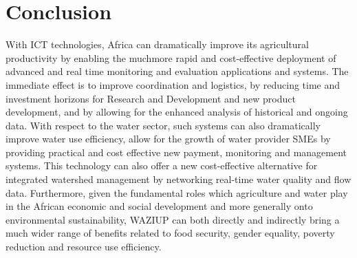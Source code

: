 
\section{Conclusion}
With ICT technologies, Africa can dramatically improve its agricultural productivity by enabling the muchmore rapid and cost-effective deployment of advanced and real time monitoring and evaluation applications and systems. 
The immediate effect is to improve coordination and logistics, by reducing time and investment horizons for Research and Development and new product development, and by allowing for the enhanced analysis of historical and ongoing data. 
With respect to the water sector, such systems can also dramatically improve water use efficiency, allow for the growth of water provider SMEs by providing practical and cost effective new payment, monitoring and management systems.
This technology can also offer a new cost-effective alternative for integrated watershed management by networking real-time water quality and flow data. 
Furthermore, given the fundamental roles which agriculture and water play in the African economic and social development and more generally onto environmental sustainability, WAZIUP can both directly and indirectly bring a much wider range of benefits related to food security, gender equality, poverty reduction and resource use efficiency.
